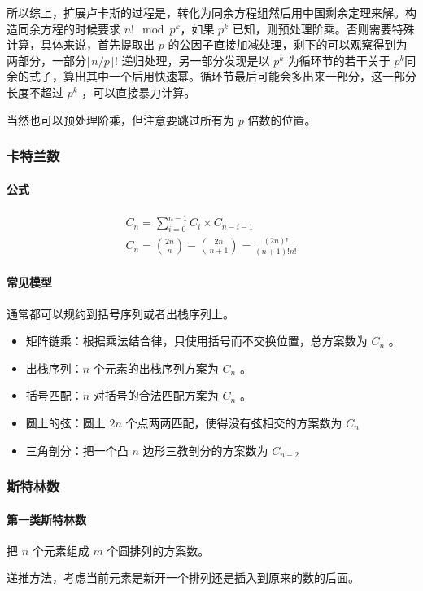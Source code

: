 \documentclass[UTF-8]{ctexart}
\begin{document}
	所以综上，扩展卢卡斯的过程是，转化为同余方程组然后用中国剩余定理来解。构造同余方程的时候要求 $n! \mod{p ^ k}$，如果 $p ^ k$ 已知，则预处理阶乘。否则需要特殊计算，具体来说，首先提取出 $p$ 的公因子直接加减处理，剩下的可以观察得到为两部分，一部分$\lfloor n/p \rfloor!$ 递归处理，另一部分发现是以 $p ^ k $ 为循环节的若干关于 $p ^ k $同余的式子，算出其中一个后用快速幂。循环节最后可能会多出来一部分，这一部分长度不超过 $p ^ k$ ，可以直接暴力计算。
	
	当然也可以预处理阶乘，但注意要跳过所有为 $p$ 倍数的位置。
	\subsubsection{卡特兰数}
	\paragraph{公式}
	
	\begin{align}
	C_n=\sum_{i=0}^{n-1} C_i \times C_{n-i-1} \nonumber \\
	C_n={2n \choose n}-{2n \choose n+1}=\frac{(2n)!}{(n+1)!n!} \nonumber
	\end{align}
	
	\paragraph{常见模型}
	通常都可以规约到括号序列或者出栈序列上。
	\begin{itemize}
		\item 矩阵链乘：根据乘法结合律，只使用括号而不交换位置，总方案数为 $C_n$ 。
		\item 出栈序列：$n$ 个元素的出栈序列方案为 $C_n$ 。
		\item 括号匹配：$n$ 对括号的合法匹配方案为 $C_n$ 。
		\item 圆上的弦：圆上 $2n$ 个点两两匹配，使得没有弦相交的方案数为 $C_n$
		\item 三角剖分：把一个凸 $n$ 边形三教剖分的方案数为 $C_{n-2}$
	\end{itemize}
	\subsubsection{斯特林数}
	\paragraph{第一类斯特林数} 把 $n$ 个元素组成 $m$ 个圆排列的方案数。
	
	递推方法，考虑当前元素是新开一个排列还是插入到原来的数的后面。
	
\end{document}
